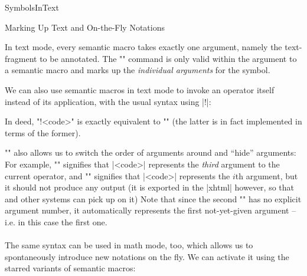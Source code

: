 \begin{smodule}{SymbolsInText}
\begin{sfragment}{Marking Up Text and On-the-Fly Notations}
    \begin{function}{\arg}
        In text mode, every semantic macro takes exactly one
        argument, namely the text-fragment to be annotated.
        The \stexcode"\arg" command is only valid within the
        argument to a semantic macro and marks up the 
        \emph{individual arguments} for the symbol.
    \end{function}

    We can also use semantic macros in text mode to invoke
    an operator itself instead of its application, with the
    usual syntax using |!|:

    In deed, \stexcode"\symbolname!{<code>}" is exactly equivalent to
    \stexcode"" (the latter is in fact
    implemented in terms of the former).

    \stexcode"\arg" also allows us to switch the order of arguments
    around and ``hide'' arguments: For example, \stexcode""
    signifies that |<code>| represents the \emph{third}
    argument to the current operator, and \stexcode""
    signifies that |<code>| represents the $i$th argument, but it
    should not produce any output (it is exported in the |xhtml|
    however, so that \mmt and other systems can pick up on it)
    Note that since the second \stexcode"\arg" has no explicit argument
    number, it automatically represents the first not-yet-given
    argument -- i.e. in this case the first one.

    \paragraph{} The same syntax can be used in math mode, too,
    which allows us to spontaneously introduce new notations on the
    fly. We can activate it using the starred variants of semantic macros:


\end{sfragment}
\end{smodule}


